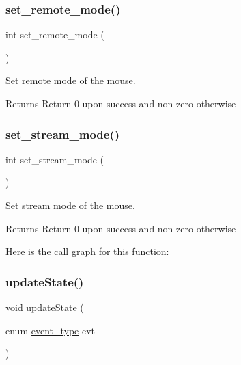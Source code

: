 \subsubsection{\texorpdfstring{set\_remote\_mode()}{set\_remote\_mode()}}
{\footnotesize\ttfamily int set\+\_\+remote\+\_\+mode (\begin{DoxyParamCaption}{ }\end{DoxyParamCaption})}



Set remote mode of the mouse. 

\begin{DoxyReturn}{Returns}
Return 0 upon success and non-\/zero otherwise 
\end{DoxyReturn}
\mbox{\label{group__mouse_gabf86ae410ee145ab149b704b7c09d4a0}} 
\subsubsection{\texorpdfstring{set\_stream\_mode()}{set\_stream\_mode()}}
{\footnotesize\ttfamily int set\+\_\+stream\+\_\+mode (\begin{DoxyParamCaption}{ }\end{DoxyParamCaption})}



Set stream mode of the mouse. 

\begin{DoxyReturn}{Returns}
Return 0 upon success and non-\/zero otherwise 
\end{DoxyReturn}
Here is the call graph for this function\+:
\mbox{\label{group__mouse_gabf7bb26fb5683538fbe802be6df228f1}} 
\subsubsection{\texorpdfstring{updateState()}{updateState()}}
{\footnotesize\ttfamily void update\+State (\begin{DoxyParamCaption}\item[{enum \mbox{\hyperlink{group__mouse_ga430b444c74dd3fd1472a31714ec5f1ce}{event\+\_\+type}}}]{evt }\end{DoxyParamCaption})}



